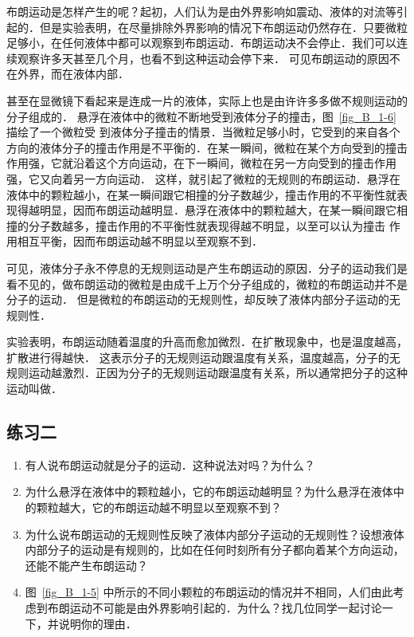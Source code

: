 布朗运动是怎样产生的呢？起初，人们认为是由外界影响如震动、液体的对流等引起的．但是实验表明，在尽量排除外界影响的情况下布朗运动仍然存在．只要微粒足够小，在任何液体中都可以观察到布朗运动．布朗运动决不会停止．我们可以连续观察许多天甚至几个月，也看不到这种运动会停下来．
可见布朗运动的原因不在外界，而在液体内部．

甚至在显微镜下看起来是连成一片的液体，实际上也是由许许多多做不规则运动的分子组成的．
悬浮在液体中的微粒不断地受到液体分子的撞击，图~\ref{fig_B_1-6} 描绘了一个微粒受
到液体分子撞击的情景．当微粒足够小时，它受到的来自各个方向的液体分子的撞击作用是不平衡的．在某一瞬间，微粒在某个方向受到的撞击作用强，它就沿着这个方向运动，在下一瞬间，微粒在另一方向受到的撞击作用强，它又向着另一方向运动．
这样，就引起了微粒的无规则的布朗运动．悬浮在液体中的颗粒越小，在某一瞬间跟它相撞的分子数越少，撞击作用的不平衡性就表现得越明显，因而布朗运动越明显．悬浮在液体中的颗粒越大，在某一瞬间跟它相撞的分子数越多，撞击作用的不平衡性就表现得越不明显，以至可以认为撞击
作用相互平衡，因而布朗运动越不明显以至观察不到．

可见，液体分子永不停息的无规则运动是产生布朗运动的原因．分子的运动我们是看不见的，做布朗运动的微粒是由成千上万个分子组成的，微粒的布朗运动并不是分子的运动．
但是微粒的布朗运动的无规则性，却反映了液体内部分子运动的无规则性．

实验表明，布朗运动随着温度的升高而愈加微烈．在扩散现象中，也是温度越高，扩散进行得越快．
这表示分子的无规则运动跟温度有关系，温度越高，分子的无规则运动越激烈．正因为分子的无规则运动跟温度有关系，所以通常把分子的这种运动叫做．


\subsection*{练习二}
\begin{enumerate}
\item 有人说布朗运动就是分子的运动．这种说法对吗？为什么？
\item 为什么悬浮在液体中的颗粒越小，它的布朗运动越明显？为什么悬浮在液体中的颗粒越大，它的布朗运动越不明显以至观察不到？
\item 为什么说布朗运动的无规则性反映了液体内部分子运动的无规则性？设想液体内部分子的运动是有规则的，比如在任何时刻所有分子都向着某个方向运动，还能不能产生布朗运动？
\item  图~\ref{fig_B_1-5} 中所示的不同小颗粒的布朗运动的情况并不相同，人们由此考虑到布朗运动不可能是由外界影响引起的．为什么？找几位同学一起讨论一下，并说明你的理由．
\end{enumerate}

